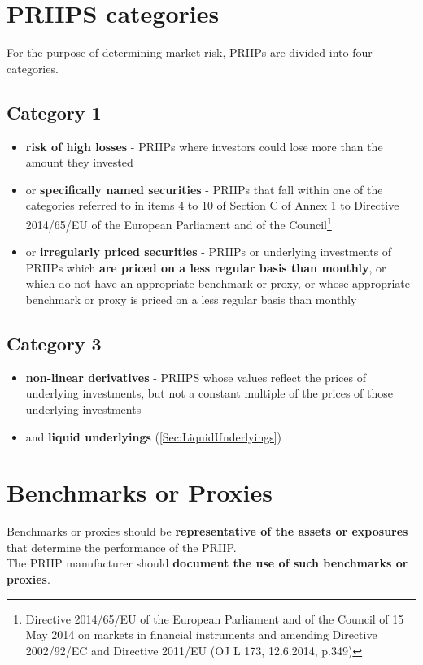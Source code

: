 \section{PRIIPS categories}
For the purpose of determining market risk, PRIIPs are divided into four categories.


\subsection{Category 1}
\begin{itemize}
	\item \textbf{\color{blue}risk of high losses} - PRIIPs where investors could lose more than the amount they invested
	\item or \textbf{\color{blue}specifically named securities} - PRIIPs that fall within one of the categories referred to in items 4 to 10 of Section C of Annex 1 to Directive 2014/65/EU of the European Parliament and of the Council\footnote{Directive 2014/65/EU of the European Parliament and of the Council of 15 May 2014 on markets in financial instruments and amending Directive 2002/92/EC and Directive 2011/EU (OJ L 173, 12.6.2014, p.349)}
	\item or \textbf{\color{blue}irregularly priced securities} - PRIIPs or underlying investments of PRIIPs which \textbf{\color{Mahogany}are priced on a less regular basis than monthly}, or which do not have an appropriate benchmark or proxy, or whose appropriate benchmark or proxy is priced on a less regular basis than monthly
\end{itemize}

\subsection{Category 3}
\begin{itemize}
	\item \textbf{\color{blue}non-linear derivatives} - PRIIPS whose values reflect the prices of underlying investments, but not a constant multiple of the prices of those underlying investments
	\item and \textbf{\color{blue}liquid underlyings} (\ref{Sec:LiquidUnderlyings})
\end{itemize}

\section{Benchmarks or Proxies}
Benchmarks or proxies should be \textbf{\color{blue}representative of the assets or exposures} that determine the performance of the PRIIP.\\
The PRIIP manufacturer should \textbf{\color{blue}document the use of such benchmarks or proxies}. 

